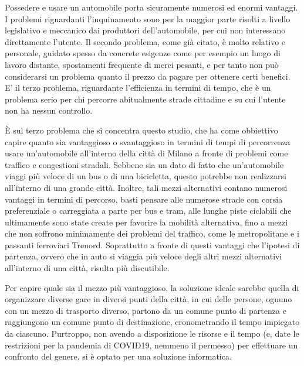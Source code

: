Possedere e usare un automobile porta sicuramente numerosi ed enormi vantaggi. I problemi riguardanti l'inquinamento sono per la maggior parte risolti a livello legislativo e meccanico dai produttori dell'automobile, per cui non interessano direttamente l'utente. Il secondo problema, come già citato, è molto relativo e personale, guidato spesso da concrete esigenze come per esempio un luogo di lavoro distante, spostamenti frequente di merci pesanti, e per tanto non può considerarsi un problema quanto il prezzo da pagare per ottenere certi benefici. E' il terzo problema, riguardante l'efficienza in termini di tempo, che è un problema serio per chi percorre abitualmente strade cittadine e su cui l'utente non ha nessun controllo.



È sul terzo problema che si concentra questo studio, che ha come obbiettivo capire quanto sia vantaggioso o svantaggioso in termini di tempi di percorrenza usare un'automobile all'interno della città di Milano a fronte di problemi come traffico e congestioni stradali.
Sebbene sia un dato di fatto che un'automobile viaggi più veloce di un bus o di una bicicletta, questo potrebbe non realizzarsi all'interno di una grande città. Inoltre, tali mezzi alternativi contano numerosi vantaggi in termini di percorso, basti pensare alle numerose strade con corsia preferenziale o carreggiata a parte per bus e tram, alle lunghe piste ciclabili che ultimamente sono state create per favorire la mobilità alternativa, fino a mezzi che non soffrono minimamente dei problemi del traffico, come le metropolitane e i passanti ferroviari Trenord. Soprattutto a fronte di questi vantaggi che l'ipotesi di partenza, ovvero che in auto si viaggia più veloce degli altri mezzi alternativi all'interno di una città, risulta più discutibile.

Per capire quale sia il mezzo più vantaggioso, la soluzione ideale sarebbe quella di organizzare diverse gare in diversi punti della città, in cui delle persone, ognuno con un mezzo di trasporto diverso, partono da un comune punto di partenza e raggiungono un comune punto di destinazione, cronometrando il tempo impiegato da ciascuno. Purtroppo, non avendo a disposizione le risorse e il tempo (e, date le restrizioni per la pandemia di COVID19, nemmeno il permesso) per effettuare un confronto del genere, si è optato per una soluzione informatica.

